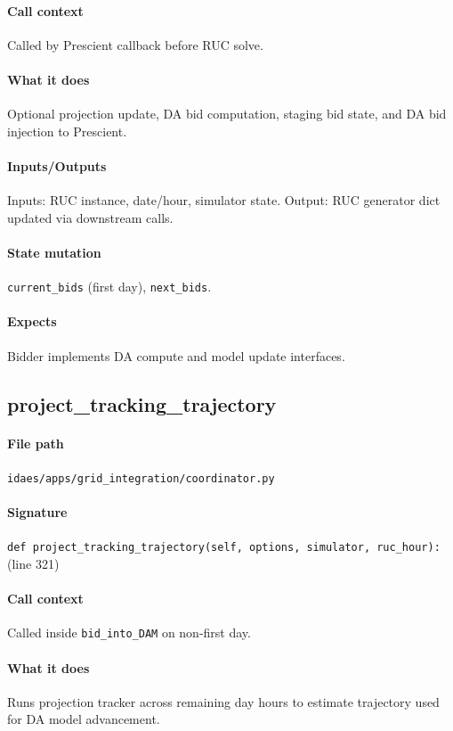 \documentclass{article}
\begin{document}
\paragraph{Call context} Called by Prescient callback before RUC solve.
\paragraph{What it does} Optional projection update, DA bid computation, staging bid state, and DA bid injection to Prescient.
\paragraph{Inputs/Outputs} Inputs: RUC instance, date/hour, simulator state. Output: RUC generator dict updated via downstream calls.
\paragraph{State mutation} \texttt{current\_bids} (first day), \texttt{next\_bids}.
\paragraph{Expects} Bidder implements DA compute and model update interfaces.

\subsection{project\_tracking\_trajectory}\label{fn:project_tracking_trajectory}
\paragraph{File path} \texttt{idaes/apps/grid\_integration/coordinator.py}
\paragraph{Signature} \texttt{def project\_tracking\_trajectory(self, options, simulator, ruc\_hour):} (line 321)
\paragraph{Call context} Called inside \texttt{bid\_into\_DAM} on non-first day.
\paragraph{What it does} Runs projection tracker across remaining day hours to estimate trajectory used for DA model advancement.
\end{document}
